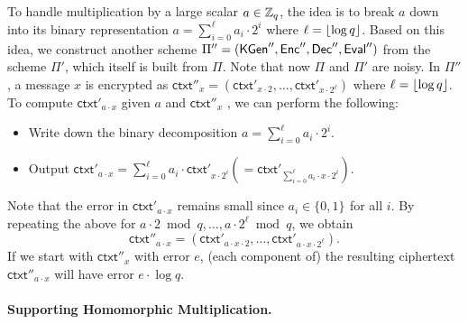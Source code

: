 \documentclass[10pt,twoside]{article}
\newcommand{\ctxt}{\mathsf{ctxt}}
\newcommand{\bits}[1][]{\{0,1\}^{#1}}
\begin{document}
To handle multiplication by a large scalar $a \in \mathbb{Z}_q$, the idea is to break $a$ down into its binary representation $a = \sum_{i=0}^{\ell} a_i \cdot 2^i$ where $\ell = \left\lfloor\log q\right\rfloor$.
Based on this idea, we construct another scheme $\Pi'' = (\mathsf{KGen}'',\mathsf{Enc}'',\mathsf{Dec}'',\mathsf{Eval}'')$ from the scheme $\Pi'$, which itself is built from $\Pi$.
Note that now $\Pi$ and $\Pi'$ are noisy.
In $\Pi''$, a message $x$ is encrypted as $\ctxt''_x = (\ctxt'_{x \cdot 2}, \ldots, \ctxt'_{x \cdot 2^\ell})$ where $\ell = \left\lfloor\log q\right\rfloor$. 
To compute $\ctxt'_{a \cdot x}$ given $a$ and $\ctxt''_x$ , we can perform the following:
\begin{itemize}
    \item Write down the binary decomposition $a = \sum_{i=0}^{\ell} a_i \cdot 2^i$.
    \item Output $\ctxt'_{a \cdot x} = \sum_{i=0}^\ell a_i \cdot \ctxt'_{x \cdot 2^i} (= \ctxt'_{\sum_{i=0}^\ell a_i \cdot x \cdot 2^i})$.
\end{itemize}
Note that the error in $\ctxt'_{a \cdot x}$ remains small since $a_i \in \bits$ for all $i$.
By repeating the above for $a \cdot 2 \bmod q, \ldots, a \cdot 2^\ell \bmod q$, we obtain
\[
    \ctxt''_{a \cdot x} = (\ctxt'_{a \cdot x \cdot 2}, \ldots, \ctxt'_{a \cdot x \cdot 2^\ell}).
\] 
If we start with $\ctxt''_x$ with error $e$, (each component of) the resulting ciphertext $\ctxt''_{a \cdot x}$ will have error $e \cdot \log q$.

\paragraph{Supporting Homomorphic Multiplication.}
\end{document}
